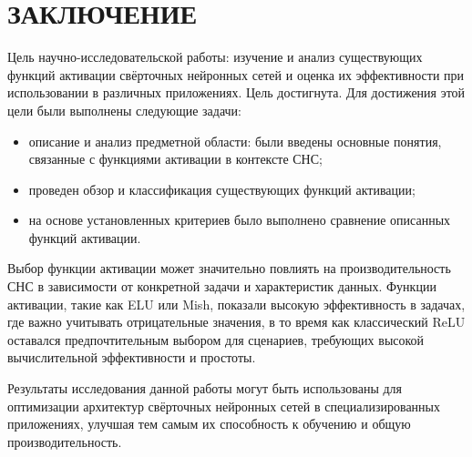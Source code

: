 \chapter*{ЗАКЛЮЧЕНИЕ}

Цель научно-исследовательской работы: изучение и анализ существующих функций активации свёрточных нейронных сетей и оценка их эффективности при использовании в различных приложениях. Цель достигнута. Для достижения этой цели были выполнены следующие задачи:

\begin{itemize}
	\item описание и анализ предметной области: были введены основные понятия, связанные с функциями активации в контексте СНС;
	\item проведен обзор и классификация существующих функций активации;
	\item на основе установленных критериев было выполнено сравнение описанных функций активации.
\end{itemize}

Выбор функции активации может значительно повлиять на производительность СНС в зависимости от конкретной задачи и характеристик данных. Функции активации, такие как ELU или Mish, показали высокую эффективность в задачах, где важно учитывать отрицательные значения, в то время как классический ReLU оставался предпочтительным выбором для сценариев, требующих высокой вычислительной эффективности и простоты.

Результаты исследования данной работы могут быть использованы для оптимизации архитектур свёрточных нейронных сетей в специализированных приложениях, улучшая тем самым их способность к обучению и общую производительность.